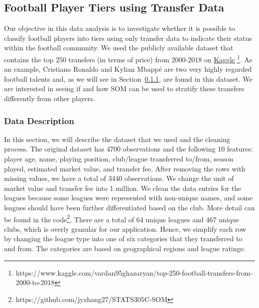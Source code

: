 \subsection{Football Player Tiers using Transfer Data}\label{ssec:transfer}

Our objective in this data analysis is to investigate 
whether it is possible to classify football players into tiers
using only transfer data to indicate their status within the football community.
We used the publicly available dataset that contains the top 250 transfers 
(in terms of price) from 2000-2018 on
\href{https://www.kaggle.com/vardan95ghazaryan/top-250-football-transfers-from-2000-to-2018}{Kaggle}
\footnote{https://www.kaggle.com/vardan95ghazaryan/top-250-football-transfers-from-2000-to-2018}. 
As an example, Cristiano Ronaldo and Kylian Mbapp\'e are two very highly regarded 
football talents and, as we will see in Section~\ref{sssec:transfer-data}, 
are found in this dataset.
We are interested in seeing if and how SOM can be used to stratify 
these transfers differently from other players. 

\subsubsection{Data Description}\label{sssec:transfer-data}

In this section, we will describe the dataset that we used
and the cleaning process.
The original dataset has 4700 observations and the following 10 features: 
player age, name, playing position, club/league transferred to/from, season played,
estimated market value, and transfer fee.
After removing the rows with missing values, we have a total of 3440 observations. 
We change the unit of market value and transfer fee into 1 million. 
We clean the data entries for the leagues because some leagues were represented
with non-unique names, and some leagues should have been further 
differentiated based on the club. 
More detail can be found in the code\footnote{https://github.com/jyzhang27/STATS305C-SOM}. 
There are a total of 64 unique leagues and 467 unique clubs, 
which is overly granular for our application. 
Hence, we simplify each row by changing the league type
into one of six categories that they transferred to and from.
The categories are based on geographical regions and league ratings:

